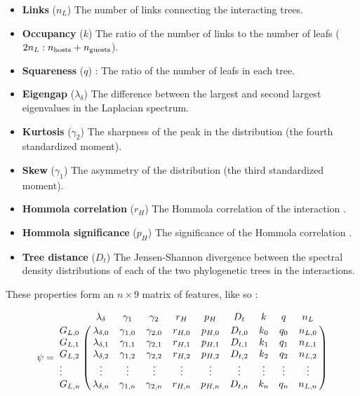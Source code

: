 \begin{itemize}
    \item{\textbf{Links} ($n_{L}$)} The number of links connecting the interacting trees.

    \item{\textbf{Occupancy} ($k$)} The ratio of the number of links to the number of leafs ($2 n_{L} : n_{\rm hosts} + n_{\rm guests}$).

    \item{\textbf{Squareness} ($q$)} : The ratio of the number of leafs in each tree.

    \item{\textbf{Eigengap} ($\lambda_{\delta}$)} The difference between the largest and second largest eigenvalues in the Laplacian spectrum.
    
    \item{\textbf{Kurtosis} ($\gamma_{2}$)} The sharpness of the peak in the distribution (the fourth standardized moment).

    \item{\textbf{Skew} ($\gamma_{1}$)} The asymmetry of the distribution (the third standardized moment).

    \item{\textbf{Hommola correlation} ($r_{H}$)} The Hommola correlation of the interaction \cite{hommola2009permutation}.

    \item{\textbf{Hommola significance} ($p_{H}$)} The significance of the Hommola correlation \cite{hommola2009permutation}.

    \item{\textbf{Tree distance} ($D_{t}$)} The Jensen-Shannon divergence between the spectral density distributions of each of the two phylogenetic trees in the interactions.
\end{itemize}

\noindent These properties form an $n\times 9$ matrix of features, like so :

\begin{equation}
\psi =
\bordermatrix{
        & \lambda_{\delta}   & \gamma_{1}   & \gamma_{2}   & r_{H}   & p_{H}   & D_{t}   & k      & q      & n_{L}   \cr
G_{L,0} & \lambda_{\delta,0} & \gamma_{1,0} & \gamma_{2,0} & r_{H,0} & p_{H,0} & D_{t,0} & k_{0}  & q_{0}  & n_{L,0} \cr
G_{L,1} & \lambda_{\delta,1} & \gamma_{1,1} & \gamma_{2,1} & r_{H,1} & p_{H,1} & D_{t,1} & k_{1}  & q_{1}  & n_{L,1} \cr
G_{L,2} & \lambda_{\delta,2} & \gamma_{1,2} & \gamma_{2,2} & r_{H,2} & p_{H,2} & D_{t,2} & k_{2}  & q_{2}  & n_{L,2} \cr
\vdots  & \vdots             & \vdots       & \vdots       & \vdots  & \vdots  & \vdots  & \vdots & \vdots & \vdots  \cr 
G_{L,n} & \lambda_{\delta,n} & \gamma_{1,n} & \gamma_{2,n} & r_{H,n} & p_{H,n} & D_{t,n} & k_{n}  & q_{n}  & n_{L,n} \cr
}
\end{equation}

